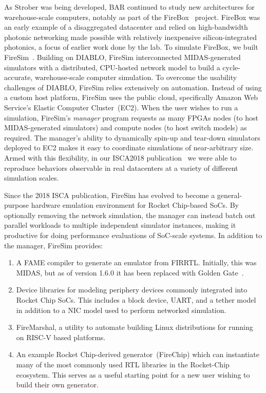 As Strober was being developed, BAR continued to study new architectures for
warehouse-scale computers, notably as part of the FireBox~\cite{FireBox} project.
FireBox was an early example of a disaggregated datacenter and relied on
high-bandwidth photonic networking made possible with relatively inexpensive
silicon-integrated photonics, a focus of earlier work done by the lab.  To
simulate FireBox, we built FireSim~\cite{FireSim}. Building on DIABLO, FireSim interconnected MIDAS-generated
simulators with a distributed, CPU-hosted network model to build a
cycle-accurate, warehouse-scale computer simulation. To overcome the usability
challenges of DIABLO, FireSim relies extensively on automation.  Instead of
using a custom host platform, FireSim uses the public cloud, specifically
Amazon Web Service's Elastic Computer Cluster~(EC2).  When the user wishes to run a simulation, FireSim's \emph{manager} program
requests as many FPGAs nodes (to host
MIDAS-generated simulators) and compute nodes (to host switch models) as required. The manager's ability to dynamically spin-up and tear-down simulators
deployed to EC2 makes it easy to coordinate simulations of near-arbitrary size. Armed with this flexibility, in our
ISCA2018 publication~\cite{FireSim} we were able to reproduce behaviors observable in real
datacenters at a variety of different simulation scales.

Since the 2018 ISCA publication, FireSim has evolved to become a
general-purpose hardware emulation environment for Rocket Chip-based SoCs. By
optionally removing the network simulation, the manager can instead batch out
parallel workloads to multiple independent simulator instances, making it
productive for doing performance evaluations of SoC-scale systems.
In addition to the manager, FireSim provides:
\begin{enumerate}
    \item A FAME compiler to generate an emulator from FIRRTL. Initially, this
        was MIDAS, but as of version 1.6.0 it has been replaced with Golden Gate~\cite{GoldenGate}.
    \item Device libraries for modeling periphery devices commonly integrated
        into Rocket Chip SoCs. This includes a block device, UART,
        and a tether model in addition to a NIC model used to perform networked simulation.
    \item FireMarshal, a utility to automate building Linux distributions for
        running on RISC-V based platforms.
    \item An example Rocket Chip-derived generator~(FireChip) which can instantiate many of the most commonly
        used RTL libraries in the Rocket-Chip ecosystem. This serves as a useful starting point for a new user
        wishing to build their own generator.
\end{enumerate}

